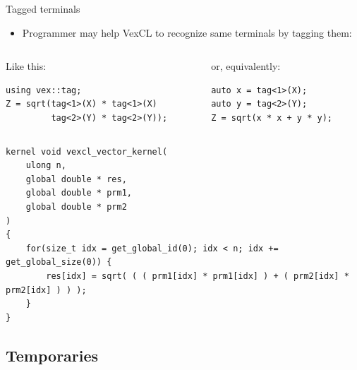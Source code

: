 \documentclass[@BEAMER_OPTIONS@]{beamer}
\begin{document}
\begin{frame}[fragile]{Tagged terminals}
    \begin{itemize}
        \item Programmer may help VexCL to recognize same terminals by
            tagging them:
    \end{itemize}
    \begin{columns}
        \begin{column}{0.48\textwidth}
            \begin{exampleblock}{Like this:}
                \begin{lstlisting}
using vex::tag;
Z = sqrt(tag<1>(X) * tag<1>(X)
         tag<2>(Y) * tag<2>(Y));
                \end{lstlisting}
            \end{exampleblock}
        \end{column}
        \begin{column}{0.48\textwidth}
            \begin{exampleblock}{or, equivalently:}
                \begin{lstlisting}
auto x = tag<1>(X);
auto y = tag<2>(Y);
Z = sqrt(x * x + y * y);
                \end{lstlisting}
            \end{exampleblock}
        \end{column}
    \end{columns}
    \begin{exampleblock}{}
        \begin{lstlisting}
kernel void vexcl_vector_kernel(
    ulong n,
    global double * res,
    global double * prm1,
    global double * prm2
)
{
    for(size_t idx = get_global_id(0); idx < n; idx += get_global_size(0)) {
        res[idx] = sqrt( ( ( prm1[idx] * prm1[idx] ) + ( prm2[idx] * prm2[idx] ) ) );
    }
}
        \end{lstlisting}
    \end{exampleblock}
\end{frame}

\subsection{Temporaries}
\end{document}
